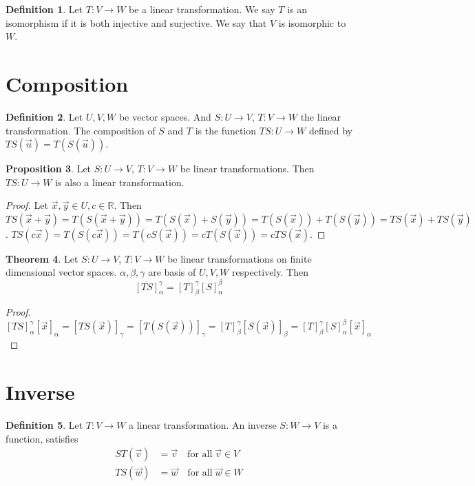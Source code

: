 \documentclass{article}
\theoremstyle{definition}
\newtheorem{theorem}{Theorem}[section]
\newtheorem{proposition}[theorem]{Proposition}
\newtheorem{definition}[theorem]{Definition}
\theoremstyle{remark}
\begin{document}
\begin{definition}
    Let $T:V\rightarrow W$ be a linear transformation. 
    We say $T$ is an isomorphism if it is both injective and surjective.
    We say that $V$ is isomorphic to $W$.
\end{definition}

\section{Composition}

\begin{definition}
    Let  $U,V,W$ be vector spaces. And $S:U\rightarrow V$, $T:V\rightarrow W$ the linear transformation. The composition of $S$ and $T$ is the function $TS:U\rightarrow W$ defined by $TS(\vec{u})=T(S(\vec{u}))$.
\end{definition}

\begin{proposition}
    Let $S:U\rightarrow V$, $T:V\rightarrow W$ be linear transformations. Then $TS:U\rightarrow W$ is also a linear transformation.
\end{proposition}

\begin{proof}
    Let $\vec{x},\vec{y}\in U,c\in\mathbb{R}$.
    Then $TS(\vec{x}+\vec{y})=T(S(\vec{x}+\vec{y}))=T(S(\vec{x})+S(\vec{y}))=T(S(\vec{x}))+T(S(\vec{y}))=TS(\vec{x})+TS(\vec{y})$.
    $TS(c\vec{x})=T(S(c\vec{x}))=T(cS(\vec{x}))=cT(S(\vec{x}))=cTS(\vec{x})$.
\end{proof}

\begin{theorem}
    Let $S:U\rightarrow V$, $T:V\rightarrow W$ be linear transformations on finite dimensional vector spaces.
    $\alpha,\beta,\gamma$ are basis of $U,V,W$ respectively. 
    Then
    \[
    [TS]_{\alpha}^{\gamma}=[T]_{\beta}^{\gamma}[S]_{\alpha}^{\beta}
    \]
\end{theorem}

\begin{proof}
    $[TS]_{\alpha}^{\gamma}[\vec{x}]_{\alpha}=[TS(\vec{x})]_{\gamma}=[T(S(\vec{x}))]_{\gamma}=[T]_{\beta}^{\gamma}[S(\vec{x})]_{\beta}=[T]_{\beta}^{\gamma}[S]_{\alpha}^{\beta}[\vec{x}]_{\alpha}$
\end{proof}

\section{Inverse}

\begin{definition}
    Let $T:V\rightarrow W$ a linear transformation. 
    An inverse $S:W\rightarrow V$ is a function, satisfies 
    \[
    \begin{aligned}
        ST(\vec{v})&=\vec{v}\quad \text{for all}\;\vec{v}\in V\\
        TS(\vec{w})&=\vec{w}\quad \text{for all}\;\vec{w}\in W
    \end{aligned}
    \]
\end{definition}
\end{document}
